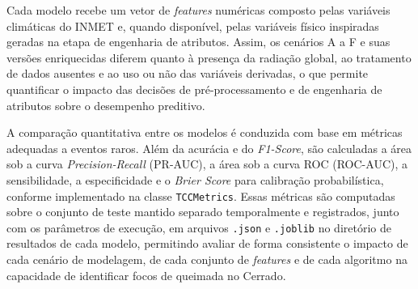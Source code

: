 Cada modelo recebe um vetor de \textit{features} numéricas composto pelas variáveis climáticas do INMET e, quando disponível, pelas variáveis físico inspiradas geradas na etapa de engenharia de atributos. Assim, os cenários A a F e suas versões enriquecidas diferem quanto à presença da radiação global, ao tratamento de dados ausentes e ao uso ou não das variáveis derivadas, o que permite quantificar o impacto das decisões de pré-processamento e de engenharia de atributos sobre o desempenho preditivo.

A comparação quantitativa entre os modelos é conduzida com base em métricas adequadas a eventos raros. Além da acurácia e do \textit{F1-Score}, são calculadas a área sob a curva \textit{Precision-Recall} (PR-AUC), a área sob a curva ROC (ROC-AUC), a sensibilidade, a especificidade e o \textit{Brier Score} para calibração probabilística, conforme implementado na classe \texttt{TCCMetrics}. Essas métricas são computadas sobre o conjunto de teste mantido separado temporalmente e registrados, junto com os parâmetros de execução, em arquivos \texttt{.json} e \texttt{.joblib} no diretório de resultados de cada modelo, permitindo avaliar de forma consistente o impacto de cada cenário de modelagem, de cada conjunto de \textit{features} e de cada algoritmo na capacidade de identificar focos de queimada no Cerrado.
